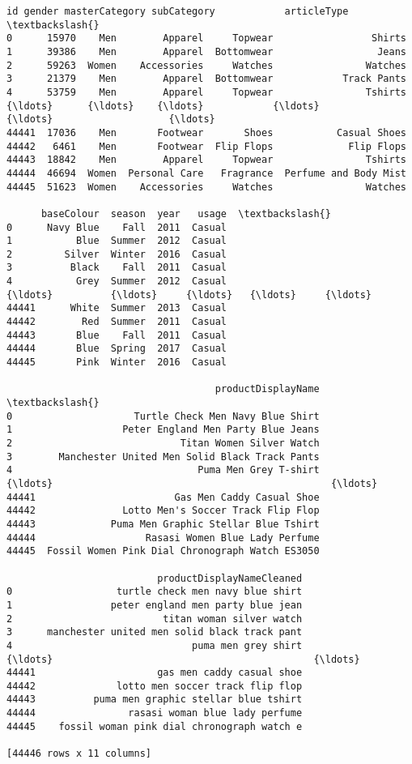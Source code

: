 \documentclass[11pt]{article}
\makeatletter
\newcommand{\boxspacing}{\kern\kvtcb@left@rule\kern\kvtcb@boxsep}
\newcommand{\prompt}[4]{
        {\ttfamily\llap{{\color{#2}[#3]:\hspace{3pt}#4}}\vspace{-\baselineskip}}
    }
\makeatother
\begin{document}
            \begin{tcolorbox}[breakable, size=fbox, boxrule=.5pt, pad at break*=1mm, opacityfill=0]
\prompt{Out}{outcolor}{13}{\boxspacing}
\begin{Verbatim}[commandchars=\\\{\}]
          id gender masterCategory subCategory            articleType  \textbackslash{}
0      15970    Men        Apparel     Topwear                 Shirts
1      39386    Men        Apparel  Bottomwear                  Jeans
2      59263  Women    Accessories     Watches                Watches
3      21379    Men        Apparel  Bottomwear            Track Pants
4      53759    Men        Apparel     Topwear                Tshirts
{\ldots}      {\ldots}    {\ldots}            {\ldots}         {\ldots}                    {\ldots}
44441  17036    Men       Footwear       Shoes           Casual Shoes
44442   6461    Men       Footwear  Flip Flops             Flip Flops
44443  18842    Men        Apparel     Topwear                Tshirts
44444  46694  Women  Personal Care   Fragrance  Perfume and Body Mist
44445  51623  Women    Accessories     Watches                Watches

      baseColour  season  year   usage  \textbackslash{}
0      Navy Blue    Fall  2011  Casual
1           Blue  Summer  2012  Casual
2         Silver  Winter  2016  Casual
3          Black    Fall  2011  Casual
4           Grey  Summer  2012  Casual
{\ldots}          {\ldots}     {\ldots}   {\ldots}     {\ldots}
44441      White  Summer  2013  Casual
44442        Red  Summer  2011  Casual
44443       Blue    Fall  2011  Casual
44444       Blue  Spring  2017  Casual
44445       Pink  Winter  2016  Casual

                                    productDisplayName  \textbackslash{}
0                     Turtle Check Men Navy Blue Shirt
1                   Peter England Men Party Blue Jeans
2                             Titan Women Silver Watch
3        Manchester United Men Solid Black Track Pants
4                                Puma Men Grey T-shirt
{\ldots}                                                {\ldots}
44441                        Gas Men Caddy Casual Shoe
44442               Lotto Men's Soccer Track Flip Flop
44443             Puma Men Graphic Stellar Blue Tshirt
44444                   Rasasi Women Blue Lady Perfume
44445  Fossil Women Pink Dial Chronograph Watch ES3050

                          productDisplayNameCleaned
0                  turtle check men navy blue shirt
1                 peter england men party blue jean
2                          titan woman silver watch
3      manchester united men solid black track pant
4                               puma men grey shirt
{\ldots}                                             {\ldots}
44441                     gas men caddy casual shoe
44442              lotto men soccer track flip flop
44443          puma men graphic stellar blue tshirt
44444                rasasi woman blue lady perfume
44445    fossil woman pink dial chronograph watch e

[44446 rows x 11 columns]
\end{Verbatim}
\end{tcolorbox}
        
\end{document}
